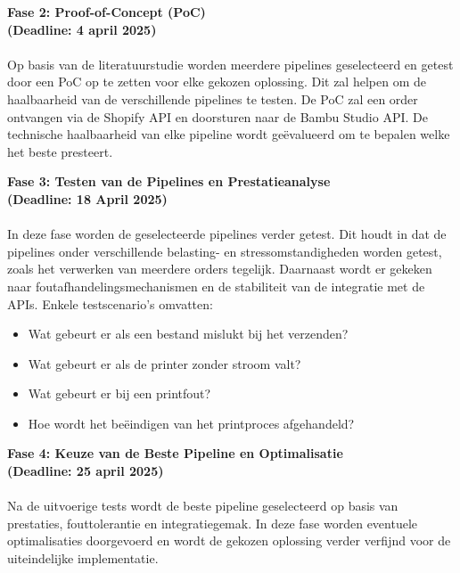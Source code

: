 \textbf{Fase 2: Proof-of-Concept (PoC)}\\
\textbf{(Deadline: 4 april 2025)}\\\\
Op basis van de literatuurstudie worden meerdere pipelines geselecteerd en getest door een PoC op te zetten voor elke gekozen oplossing. Dit zal helpen om de haalbaarheid van de verschillende pipelines te testen. De PoC zal een order ontvangen via de Shopify API en doorsturen naar de Bambu Studio API. De technische haalbaarheid van elke pipeline wordt geëvalueerd om te bepalen welke het beste presteert.
\vspace{1em}

\textbf{Fase 3: Testen van de Pipelines en Prestatieanalyse}\\
\textbf{(Deadline: 18 April 2025)}\\\\
In deze fase worden de geselecteerde pipelines verder getest. Dit houdt in dat de pipelines onder verschillende belasting- en stressomstandigheden worden getest, zoals het verwerken van meerdere orders tegelijk. Daarnaast wordt er gekeken naar foutafhandelingsmechanismen en de stabiliteit van de integratie met de APIs. Enkele testscenario's omvatten: 
\begin{itemize}
    \item Wat gebeurt er als een bestand mislukt bij het verzenden?
    \item Wat gebeurt er als de printer zonder stroom valt?
    \item Wat gebeurt er bij een printfout?
    \item Hoe wordt het beëindigen van het printproces afgehandeld? 
\end{itemize}
\vspace{1em}

\textbf{Fase 4: Keuze van de Beste Pipeline en Optimalisatie}\\
\textbf{(Deadline: 25 april 2025)}\\\\
Na de uitvoerige tests wordt de beste pipeline geselecteerd op basis van prestaties, fouttolerantie en integratiegemak. In deze fase worden eventuele optimalisaties doorgevoerd en wordt de gekozen oplossing verder verfijnd voor de uiteindelijke implementatie.

